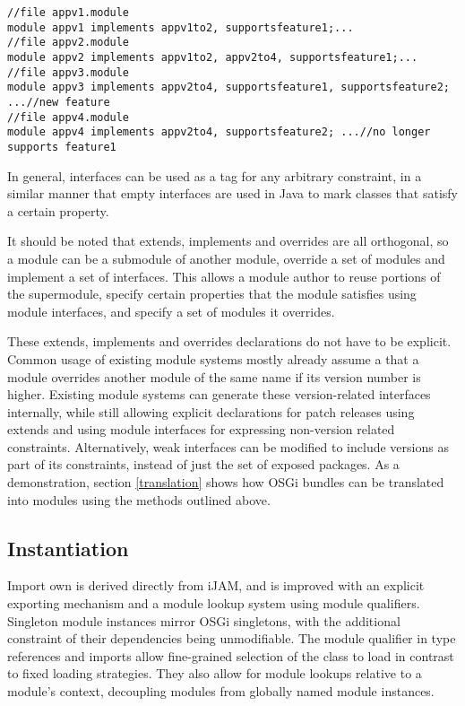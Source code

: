 \begin{lstlisting}[caption=Interfaces as Properties]
//file appv1.module
module appv1 implements appv1to2, supportsfeature1;...
//file appv2.module
module appv2 implements appv1to2, appv2to4, supportsfeature1;...
//file appv3.module
module appv3 implements appv2to4, supportsfeature1, supportsfeature2; ...//new feature
//file appv4.module
module appv4 implements appv2to4, supportsfeature2; ...//no longer supports feature1
\end{lstlisting}

In general, interfaces can be used as a tag for any arbitrary constraint, 
in a similar manner that empty interfaces are used in Java to mark classes 
that satisfy a certain property.

It should be noted that extends, implements and overrides are all orthogonal,
so a module can be a submodule of another module, override a set of modules and
implement a set of interfaces. This allows a module author to reuse portions
of the supermodule, specify certain properties that the module satisfies
using module interfaces, and specify a set of modules it overrides.

These extends, implements and overrides declarations do not have to be explicit.
Common usage of existing module systems mostly already assume a that a 
module overrides another module of the same name if its version 
number is higher. Existing module systems can generate these version-related interfaces 
internally, while still allowing explicit declarations for patch releases 
using extends and using module interfaces for expressing non-version
related constraints. Alternatively, weak interfaces can be modified to include
versions as part of its constraints, instead of just the set of exposed packages.
As a demonstration, section \ref{translation} shows how OSGi bundles can be
translated into modules using the methods outlined above.



\subsection{Instantiation}

Import own is derived directly from iJAM, and is improved with an explicit exporting 
mechanism and a module lookup system using module qualifiers. Singleton module instances mirror
OSGi singletons, with the additional constraint of their dependencies being unmodifiable. 
The module qualifier in type references and
imports allow fine-grained selection of the class to load in contrast
to fixed loading strategies. They also allow for module lookups relative to
a module's context, decoupling modules from globally named module instances.

